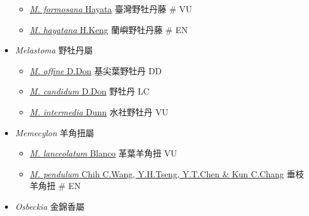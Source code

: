 \begin{itemize}
  \begin{itemize}
        \item[] \href{http://www.theplantlist.org/tpl1.1/search?q=Medinilla+formosana}{\textit{M. formosana} Hayata}   臺灣野牡丹藤  \# VU
        \item[] \href{http://www.theplantlist.org/tpl1.1/search?q=Medinilla+hayatana}{\textit{M. hayatana} H.Keng}   蘭嶼野牡丹藤  \# EN
  \end{itemize}
 \item[] \textit{Melastoma} 野牡丹屬
                                
  \begin{itemize}
        \item[] \href{http://www.theplantlist.org/tpl1.1/search?q=Melastoma+affine}{\textit{M. affine} D.Don}   基尖葉野牡丹   DD
        \item[] \href{http://www.theplantlist.org/tpl1.1/search?q=Melastoma+candidum}{\textit{M. candidum} D.Don}   野牡丹   LC
        \item[] \href{http://www.theplantlist.org/tpl1.1/search?q=Melastoma+intermedia}{\textit{M. intermedia} Dunn}   水社野牡丹   VU
  \end{itemize}
 \item[] \textit{Memecylon} 羊角扭屬
                                
  \begin{itemize}
        \item[] \href{http://www.theplantlist.org/tpl1.1/search?q=Memecylon+lanceolatum}{\textit{M. lanceolatum} Blanco}   革葉羊角扭   VU
        \item[] \href{http://www.theplantlist.org/tpl1.1/search?q=Memecylon+pendulum}{\textit{M. pendulum} Chih C.Wang, Y.H.Tseng, Y.T.Chen \& Kun C.Chang}   垂枝羊角扭  \# EN
  \end{itemize}
 \item[] \textit{Osbeckia} 金錦香屬
                                

\end{itemize}
